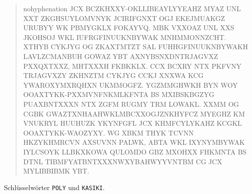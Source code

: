 \documentclass[german]{mhexsheet}
\begin{document}
\begin{exercise}[title=Vigenère-Verschlüsselung]
\begin{enumerate}
\begin{quote}\small\begin{sloppypar}\begin{hyphenrules}{nohyphenation}
  \textsf{JCX BCZKHXXY-OKLLIBEAYLYYEAHZ MYAZ UNL XXT ZKGHSUYLOMVNYK JCIRIFGNXT OGJ EKEJMUAKGZ URUBYY WK PBMYGKLX FOKAYVQ. MBK VXXOAZ UNL XXS JKOHSOJ WKL IUFRGFINUUKNBYWAK MNHMMONNZCHT. XTHYB CYKJYG OG ZKAXTMTZT SAL FUHHGFINUUKNBYWAKH LAVLZCMANBUH GOWAZ YBT AXNYBSNXDNTRJAGVXZ PXXQXTXXZ, MHTXXXH FKBKKLX. CCX BCXRY NTX PKFVNY TRJAGVXZY ZKHNZTM CYKJYG CCKJ XNXWA KCG YWAROXYMXRQHXN UKMMOGFZ. YGZMMGHWKH BYN WOY OOAXTYKK-PXXMVNFNKMLKFNTA BS MXIBSKBGZYG PUAXBNTXXXN NTX ZGFM RUGMY TRM LOWAKL. XXMM OG CGBK GWAZTXNHAAHWKLMBCXXOGJZNKHYFCZ MYEGHZ KM VNUKRYL HUUHUZK YKYNFGFL JCX KHMFCYLYKAHZ KCGKL OOAXTYKK-WAOZYXY. WG XBKM THYK TCVNN HKZYKHMRCVN AXSUVNN PALWK, ABTA WKL IXYNYMBYWAK IYLCSOYK LLBKXKOWA QULOMDO GBZ MXOHXX FHKMNTA BS DTNL TIBMFYATBNTXXXNWXYBAHWYYVNTBM CG JCX MYLIBBIBMK YBT.
  }
  \end{hyphenrules}\end{sloppypar}\end{quote}
 \end{enumerate}
\end{exercise}

\begin{solution}
 Schlüsselwörter \texttt{POLY} und \texttt{KASIKI}.
\end{solution}

% 
\end{document}
